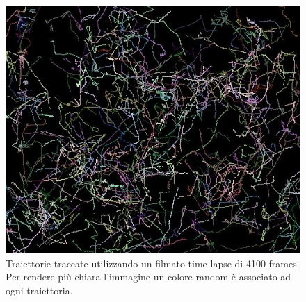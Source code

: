 \documentclass[a4paper,11pt]{paper}
\begin{document}
    \begin{figure}
      \begin{center}
        \includegraphics[scale=0.75]{result.png}
        \caption{Traiettorie traccate utilizzando un filmato time-lapse di 4100 frames. Per rendere più chiara l'immagine un colore random è associato ad ogni traiettoria.}\label{fig:res}
      \end{center}
    \end{figure}
\end{document}
